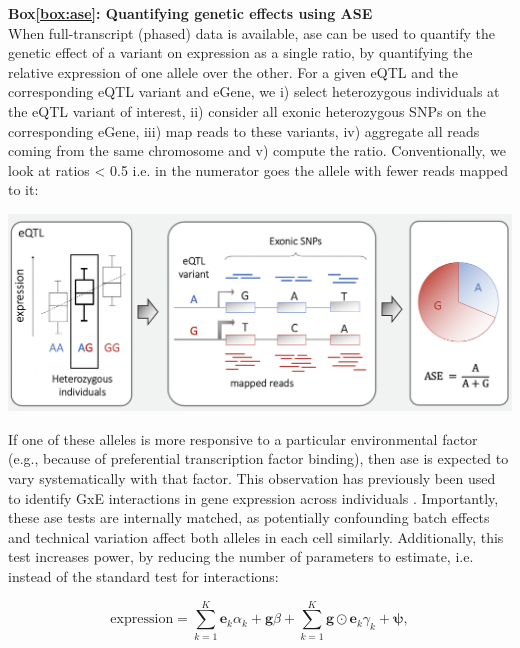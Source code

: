 \begin{Comment}
\hspace{-2.5mm}\textbf{Box\ref{box:ase}: Quantifying genetic effects using ASE}\label{box:ase}\\
\small
When full-transcript (phased) data is available, \gls{ase} can be used to quantify the genetic effect of a variant on expression as a single ratio, by quantifying the relative expression of one allele over the other.
For a given eQTL and the corresponding eQTL variant and eGene, we i) select heterozygous individuals at the eQTL variant of interest, ii) consider all exonic heterozygous SNPs on the corresponding eGene, iii) map reads to these variants, iv) aggregate all reads coming from the same chromosome and v) compute the ratio. 
Conventionally, we look at ratios < 0.5 i.e. in the numerator goes the allele with fewer reads mapped to it:

\vspace{5mm}

\includegraphics[width=15cm]{Chapter4/Fig/ASE.png}

If one of these alleles is more responsive to a particular environmental factor (e.g., because of preferential transcription factor binding), then \gls{ase} is expected to vary systematically with that factor. 
This observation has previously been used to identify GxE interactions in gene expression across individuals \cite{knowles2017allele}. 
Importantly, these \gls{ase} tests are internally matched, as potentially confounding batch effects and technical variation affect both alleles in each cell similarly.
Additionally, this test increases power, by reducing the number of parameters to estimate, i.e. instead of the standard test for interactions:  

\begin{equation*}
    \mathrm{expression} = \sum_{k=1}^{K} \mathbf{e}_k\alpha_k + \mathbf{g}\beta +
    \sum_{k=1}^{K} \mathbf{g} \odot \mathbf{e}_k\gamma_k + \boldsymbol{\psi},
\end{equation*}


\end{Comment}
